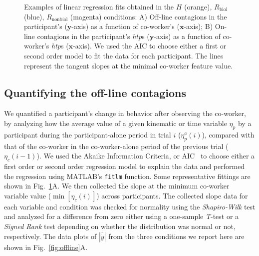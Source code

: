 \documentclass[a4paper, 12pt, oneside]{Thesis}  %
\begin{document}
\begin{figure}[t]
	\caption{Examples of linear regression fits obtained in the $\textit{H}$ (orange), $\textit{R}_{\text{biol}}$ (blue), $\textit{R}_{\text{nonbiol}}$ (magenta) conditions: A) Off-line contagions in the participant's  ($\textbf{y}$-axis) as a function of co-worker's  ($\textbf{x}$-axis); B) On-line contagions in the participant's \textit{htp}s ($\textbf{y}$-axis) as a function of co-worker's \textit{htp}s ($\textbf{x}$-axis). We used the AIC to choose either a first or second order model to fit the data for each participant. The lines represent the tangent slopes at the minimal co-worker feature value.}
	\label{fig:fitting}
\end{figure}



\subsection{Quantifying the off-line contagions}
We quantified a participant's change in behavior after observing the co-worker, by analyzing how the average value of a given kinematic or time variable $\eta_p$ by a participant during the participant-alone period in trial $i$ ($\eta_p^a (i)$), compared with that of the co-worker in the co-worker-alone period of the previous trial ($\eta_c(i-1)$). We used the Akaike Information Criteria, or AIC~\cite{Akaike:ISIT:1973} to choose either a first order or second order regression model to explain the data and performed the regression using MATLAB's {\tt fitlm} function. Some representative fittings are shown in Fig.~\ref{fig:fitting}A. We then collected the slope at the minimum co-worker variable value ($\min[\eta_c(i)]$) across participants. The collected slope data for each variable and condition was checked for normality using the {\it Shapiro-Wilk} test and analyzed for a difference from zero either using a one-sample {\it T}-test or a {\it Signed Rank} test depending on whether the distribution was normal or not, respectively. The data plots of $|\overline{\dot{y}}|$ from the three conditions we report here are shown in Fig.~\ref{fig:offline}A.
\end{document}
